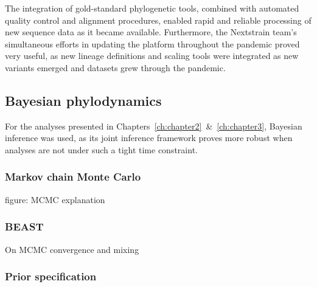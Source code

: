 The integration of gold-standard phylogenetic tools, combined with automated quality control and alignment procedures, enabled rapid and reliable processing of new sequence data as it became available.
Furthermore, the Nextstrain team's simultaneous efforts in updating the platform throughout the pandemic proved very useful, as new lineage definitions and scaling tools were integrated as new variants emerged and datasets grew through the pandemic.

\subsection{Bayesian phylodynamics}
For the analyses presented in Chapters~\ref{ch:chapter2}~\&~\ref{ch:chapter3}, Bayesian inference was used, as its joint inference framework proves more robust when analyses are not under such a tight time constraint.

\subsubsection{Markov chain Monte Carlo}
      figure: MCMC explanation
      \subsubsection{BEAST}
      On MCMC convergence and mixing
      \subsubsection{Prior specification}


